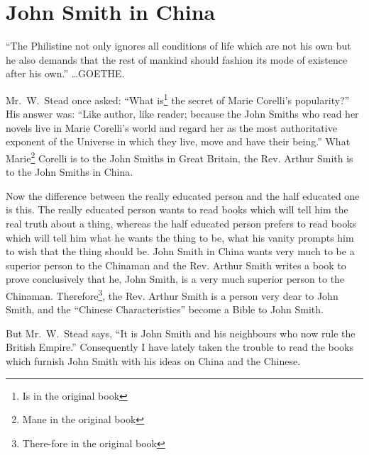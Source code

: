 \chapter{John Smith in China}
{ \scriptsize ``The Philistine not only ignores all conditions of life which are not his own but he also demands that the rest of mankind should fashion its mode of existence after his own.''\cite{num24} \dots GOETHE.}

Mr.~W.~Stead once asked: ``What is\footnote{Is in the original book} the secret of Marie Corelli's popularity?'' His answer was: ``Like author, like reader; because the John Smiths who read her novels live in Marie Corelli's world and regard her as the most authoritative exponent of the Universe in which they live, move and have their being.''
What Marie\footnote{Mane in the original book} Corelli is to the John Smiths in Great Britain, the Rev. Arthur Smith is to the John Smiths in China.

Now the difference between the really educated person and the half educated one is this.
The really educated person wants to read books which will tell him the real truth about a thing, whereas the half educated person prefers to read books which will tell him what he wants the thing to be, what his vanity prompts him to wish that the thing should be.
John Smith in China wants very much to be a superior person to the Chinaman and the Rev. Arthur Smith writes a book to prove conclusively that he, John Smith, is a very much superior person to the Chinaman.
Therefore\footnote{There-fore in the original book}, the Rev. Arthur Smith is a person very dear to John Smith, and the ``Chinese Characteristics'' become a Bible to John Smith.

But Mr.~W.~Stead says, ``It is John Smith and his neighbours who now rule the British Empire.''
Consequently I have lately taken the trouble to read the books which furnish John Smith with his ideas on China and the Chinese.


